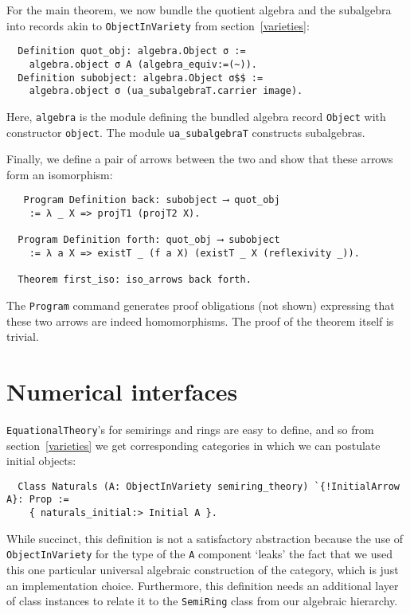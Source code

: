 \documentclass[a4paper,10pt,runningheads]{llncs}
\begin{document}
For the main theorem, we now bundle the quotient algebra and the subalgebra into records akin to \lstinline|ObjectInVariety| from section~\ref{varieties}:
\begin{lstlisting}
  Definition quot_obj: algebra.Object σ :=
    algebra.object σ A (algebra_equiv:=(~)).
  Definition subobject: algebra.Object σ$$ :=
    algebra.object σ (ua_subalgebraT.carrier image).
\end{lstlisting}
Here, \lstinline|algebra| is the module defining the bundled algebra record \lstinline|Object| with constructor \lstinline|object|. The module \lstinline|ua_subalgebraT| constructs subalgebras.

Finally, we define a pair of arrows between the two and show that these arrows form an isomorphism:
\begin{lstlisting}
   Program Definition back: subobject ⟶ quot_obj
    := λ _ X => projT1 (projT2 X).

  Program Definition forth: quot_obj ⟶ subobject
    := λ a X => existT _ (f a X) (existT _ X (reflexivity _)).

  Theorem first_iso: iso_arrows back forth.
\end{lstlisting}
The \lstinline|Program| command generates proof obligations (not shown) expressing that these two arrows are indeed homomorphisms. The proof of the theorem itself is trivial.


\section{Numerical interfaces}\label{numbers}

\lstinline|EquationalTheory|'s for semirings and rings are easy to define, and so from section~\ref{varieties} we get corresponding categories in which we can postulate initial objects:
\begin{lstlisting}
  Class Naturals (A: ObjectInVariety semiring_theory) `{!InitialArrow A}: Prop :=
    { naturals_initial:> Initial A }.
\end{lstlisting}
While succinct, this definition is not a satisfactory abstraction because the use of \lstinline|ObjectInVariety| for the type of the \lstinline|A| component `leaks' the fact that we used this one particular universal algebraic construction of the category, which is just an implementation choice. Furthermore, this definition needs an additional layer of class instances to relate it to the \lstinline|SemiRing| class from our algebraic hierarchy.
\end{document}
